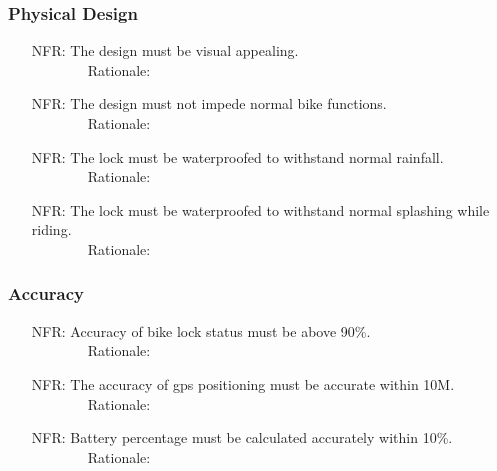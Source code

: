 \documentclass[12pt]{article}
\newcounter{nfrnum} %
\begin{document}
\subsubsection{Physical Design}
\begin{itemize}
\setlength{\itemindent}{.5in}
\item[NFR\refstepcounter{nfrnum}\thenfrnum\label{NFR4}:] The design must be visual appealing.
\\ \-\ \-\ \-\ \-\ \-\ \-\ \-\ \-\ Rationale: 
\item[NFR\refstepcounter{nfrnum}\thenfrnum\label{NFR5}:] The design must not impede normal bike functions.
\\ \-\ \-\ \-\ \-\ \-\ \-\ \-\ \-\ Rationale: 
\item[NFR\refstepcounter{nfrnum}\thenfrnum\label{NFR6}:] The lock must be waterproofed to withstand normal rainfall.
\\ \-\ \-\ \-\ \-\ \-\ \-\ \-\ \-\ Rationale: 
\item[NFR\refstepcounter{nfrnum}\thenfrnum\label{NFR7}:] The lock must be waterproofed to withstand normal splashing while riding.
\\ \-\ \-\ \-\ \-\ \-\ \-\ \-\ \-\ Rationale: 
\end{itemize}

\subsubsection{Accuracy}
\begin{itemize}
\setlength{\itemindent}{.5in}
\item[NFR\refstepcounter{nfrnum}\thenfrnum\label{NFR8}:] Accuracy of bike lock status must be above 90\%.
\\ \-\ \-\ \-\ \-\ \-\ \-\ \-\ \-\ Rationale: 
\item[NFR\refstepcounter{nfrnum}\thenfrnum\label{NFR9}:] The accuracy of gps positioning must be accurate within 10M.
\\ \-\ \-\ \-\ \-\ \-\ \-\ \-\ \-\ Rationale: 
\item[NFR\refstepcounter{nfrnum}\thenfrnum\label{NFR10}:] Battery percentage must be calculated accurately within 10\%.
\\ \-\ \-\ \-\ \-\ \-\ \-\ \-\ \-\ Rationale: 
\end{itemize}
\end{document}
